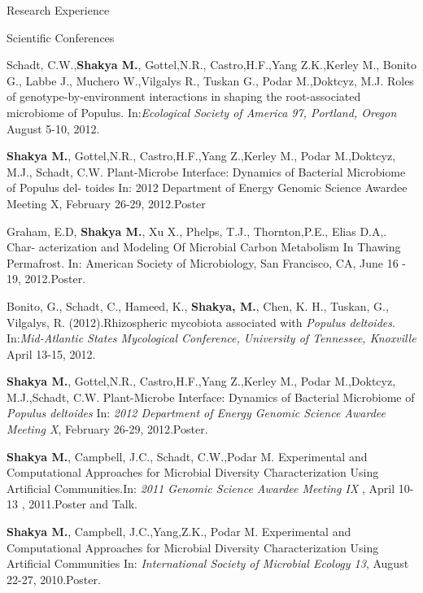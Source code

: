 \documentclass{resume} %
\begin{document}
\begin{rSection}{Research Experience}
\begin{rSection}{Scientific Conferences}
\item Schadt, C.W.,\textbf{Shakya M.}, Gottel,N.R., Castro,H.F.,Yang Z.K.,Kerley M., Bonito G., Labbe J., Muchero W.,Vilgalys R., Tuskan G., Podar M.,Doktcyz, M.J. Roles of genotype-by-environment interactions in shaping the root-associated microbiome of Populus. In:\emph{Ecological Society of America 97, Portland, Oregon} August 5-10, 2012.

\item \textbf{Shakya M.}, Gottel,N.R., Castro,H.F.,Yang Z.,Kerley M., Podar M.,Doktcyz, M.J., Schadt, C.W. Plant-Microbe Interface: Dynamics of Bacterial Microbiome of Populus del- toides In: 2012 Department of Energy Genomic Science Awardee Meeting X, February 26-29, 2012.Poster

\item Graham, E.D, \textbf{Shakya M.}, Xu X., Phelps, T.J., Thornton,P.E., Elias D.A,. Char- acterization and Modeling Of Microbial Carbon Metabolism In Thawing Permafrost. In: American Society of Microbiology, San Francisco, CA, June 16 - 19, 2012.Poster.


\item Bonito, G., Schadt, C., Hameed, K., \textbf{Shakya, M.}, Chen, K. H., Tuskan, G., Vilgalys, R. (2012).Rhizospheric mycobiota associated with \textit{Populus deltoides}. In:\emph{Mid-Atlantic States Mycological Conference, University of Tennessee, Knoxville} April 13-15, 2012.

\item \textbf{Shakya M.}, Gottel,N.R., Castro,H.F.,Yang Z.,Kerley M., Podar M.,Doktcyz, M.J.,Schadt, C.W. Plant-Microbe Interface: Dynamics of Bacterial Microbiome of \textit{Populus deltoides}  In: \emph{2012 Department of Energy Genomic Science Awardee Meeting X}, February 26-29, 2012.Poster.

\item \textbf{Shakya M.}, Campbell, J.C., Schadt, C.W.,Podar M. Experimental and Computational Approaches for Microbial Diversity Characterization Using Artificial Communities.In: \emph{2011 Genomic Science Awardee Meeting IX }, April 10-13 , 2011.Poster and Talk.

\item \textbf{Shakya M.}, Campbell, J.C.,Yang,Z.K., Podar M. Experimental and Computational Approaches for Microbial Diversity Characterization Using Artificial Communities In: \emph{International Society of Microbial Ecology 13}, August 22-27, 2010.Poster.

\end{rSection}


\end{rSection}
\end{document}
